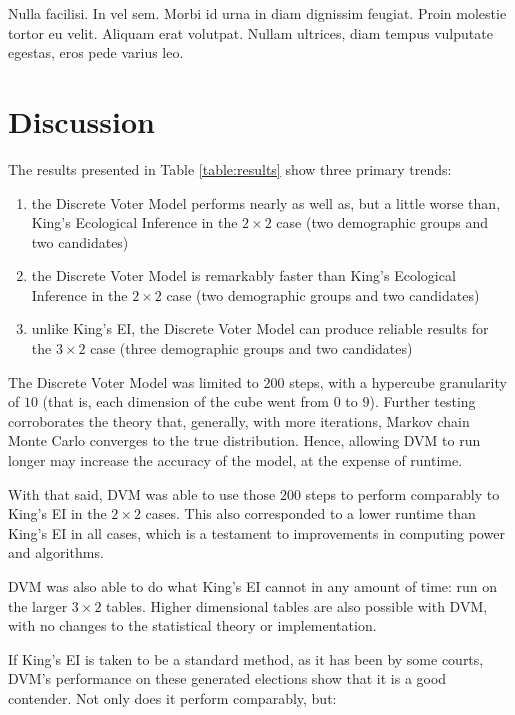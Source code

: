 \begin{savequote}[75mm]
Nulla facilisi. In vel sem. Morbi id urna in diam dignissim feugiat. Proin molestie tortor eu velit. Aliquam erat volutpat. Nullam ultrices, diam tempus vulputate egestas, eros pede varius leo.
\end{savequote}

\chapter{Discussion}

The results presented in Table \ref{table:results} show three primary trends:

\begin{enumerate}
  \item the Discrete Voter Model performs nearly as well as, but a little worse than, King's Ecological Inference in the $2 \times 2$ case (two demographic groups and two candidates)
  \item the Discrete Voter Model is remarkably faster than King's Ecological Inference in the $2 \times 2$ case (two demographic groups and two candidates)
  \item unlike King's EI, the Discrete Voter Model can produce reliable results for the $3 \times 2$ case (three demographic groups and two candidates)
\end{enumerate}

The Discrete Voter Model was limited to $200$ steps, with a hypercube granularity of $10$ (that is, each dimension of the cube went from $0$ to $9$). Further testing corroborates the theory that, generally, with more iterations, Markov chain Monte Carlo converges to the true distribution. Hence, allowing DVM to run longer may increase the accuracy of the model, at the expense of runtime.

With that said, DVM was able to use those $200$ steps to perform comparably to King's EI in the $2 \times 2$ cases. This also corresponded to a lower runtime than King's EI in all cases, which is a testament to improvements in computing power and algorithms.

DVM was also able to do what King's EI cannot in any amount of time: run on the larger $3 \times 2$ tables. Higher dimensional tables are also possible with DVM, with no changes to the statistical theory or implementation.

If King's EI is taken to be a standard method, as it has been by some courts, DVM's performance on these generated elections show that it is a good contender. Not only does it perform comparably, but:

